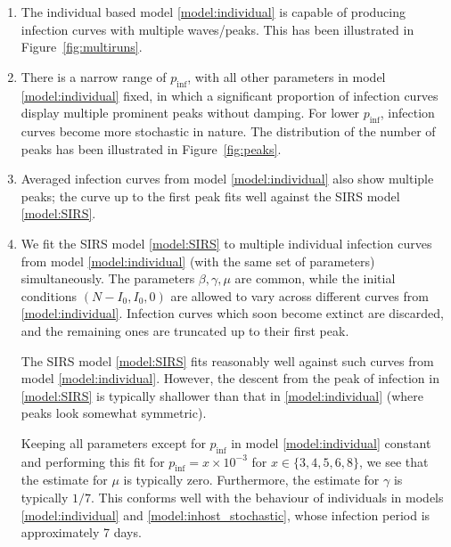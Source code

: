 \documentclass[11pt]{article}
\numberwithin{equation}{subsection}
\begin{document}
    \begin{enumerate}
        \item The individual based model \ref{model:individual} is capable of
        producing infection curves with multiple waves/peaks. This has been
        illustrated in Figure~\ref{fig:multiruns}.

        \item There is a narrow range of $p_\text{inf}$, with all other
        parameters in model \ref{model:individual} fixed, in which a
        significant proportion of infection curves display multiple prominent
        peaks without damping. For lower $p_\text{inf}$, infection curves
        become more stochastic in nature. The distribution of the number of
        peaks has been illustrated in Figure~\ref{fig:peaks}.

        \item Averaged infection curves from model \ref{model:individual} also
        show multiple peaks; the curve up to the first peak fits well against
        the SIRS model \ref{model:SIRS}.

        \item We fit the SIRS model \ref{model:SIRS} to multiple individual
        infection curves from model \ref{model:individual} (with the same set
        of parameters) simultaneously. The parameters $\beta, \gamma, \mu$ are
        common, while the initial conditions $(N - I_0, I_0, 0)$ are allowed
        to vary across different curves from \ref{model:individual}. Infection
        curves which soon become extinct are discarded, and the remaining ones
        are truncated up to their first peak.

        The SIRS model \ref{model:SIRS} fits reasonably well against such
        curves from model \ref{model:individual}. However, the descent from
        the peak of infection in \ref{model:SIRS} is typically shallower than
        that in \ref{model:individual} (where peaks look somewhat symmetric).

        Keeping all parameters except for $p_\text{inf}$ in model
        \ref{model:individual} constant and performing this fit for
        $p_\text{inf} = x \times 10^{-3}$ for $x \in \{3, 4, 5, 6, 8\}$, we
        see that the estimate for $\mu$ is typically zero. Furthermore, the
        estimate for $\gamma$ is typically $1 / 7$. This conforms well with
        the behaviour of individuals in models \ref{model:individual} and
        \ref{model:inhost_stochastic}, whose infection period is approximately
        7 days.


\end{enumerate}
\end{document}
